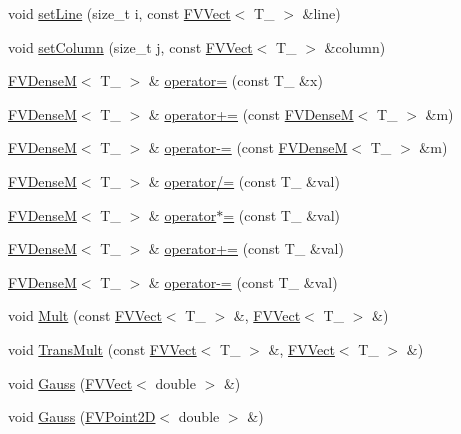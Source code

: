 \begin{DoxyCompactItemize}
\item 
void \hyperlink{classFVDenseM_a9441579962fe169d09d5fd504388da1a}{setLine} (size\_\-t i, const \hyperlink{classFVVect}{FVVect}$<$ T\_\- $>$ \&line)
\item 
void \hyperlink{classFVDenseM_a888ffa88e606f11b989361ef3b1176b6}{setColumn} (size\_\-t j, const \hyperlink{classFVVect}{FVVect}$<$ T\_\- $>$ \&column)
\item 
\hyperlink{classFVDenseM}{FVDenseM}$<$ T\_\- $>$ \& \hyperlink{classFVDenseM_a06daa883e8e99590868bfd95689d638b}{operator=} (const T\_\- \&x)
\item 
\hyperlink{classFVDenseM}{FVDenseM}$<$ T\_\- $>$ \& \hyperlink{classFVDenseM_a1beab84f76baeed61a89633796b6cc29}{operator+=} (const \hyperlink{classFVDenseM}{FVDenseM}$<$ T\_\- $>$ \&m)
\item 
\hyperlink{classFVDenseM}{FVDenseM}$<$ T\_\- $>$ \& \hyperlink{classFVDenseM_afb8664e2aaa7a8897ee8aef014a494da}{operator-\/=} (const \hyperlink{classFVDenseM}{FVDenseM}$<$ T\_\- $>$ \&m)
\item 
\hyperlink{classFVDenseM}{FVDenseM}$<$ T\_\- $>$ \& \hyperlink{classFVDenseM_aa5ac6333bf08dddc27d45d6f7ddb79c9}{operator/=} (const T\_\- \&val)
\item 
\hyperlink{classFVDenseM}{FVDenseM}$<$ T\_\- $>$ \& \hyperlink{classFVDenseM_ac8084800d4aa148e541d0b00412180df}{operator$\ast$=} (const T\_\- \&val)
\item 
\hyperlink{classFVDenseM}{FVDenseM}$<$ T\_\- $>$ \& \hyperlink{classFVDenseM_aaf2cfed3edf8bd21a0830ddf20c61462}{operator+=} (const T\_\- \&val)
\item 
\hyperlink{classFVDenseM}{FVDenseM}$<$ T\_\- $>$ \& \hyperlink{classFVDenseM_ad8aa01530a594eb81c92744755f07a4e}{operator-\/=} (const T\_\- \&val)
\item 
void \hyperlink{classFVDenseM_a75a2ced8980671cf0a67b6fdd5ededb5}{Mult} (const \hyperlink{classFVVect}{FVVect}$<$ T\_\- $>$ \&, \hyperlink{classFVVect}{FVVect}$<$ T\_\- $>$ \&)
\item 
void \hyperlink{classFVDenseM_a51effb20cd7b29168e5f8eb0a96067a0}{TransMult} (const \hyperlink{classFVVect}{FVVect}$<$ T\_\- $>$ \&, \hyperlink{classFVVect}{FVVect}$<$ T\_\- $>$ \&)
\item 
void \hyperlink{classFVDenseM_aea5f8e6172b2bc847ebe020b047508f6}{Gauss} (\hyperlink{classFVVect}{FVVect}$<$ double $>$ \&)
\item 
void \hyperlink{classFVDenseM_a24fe34cc0ea853e2b1db3a67af13a7d8}{Gauss} (\hyperlink{classFVPoint2D}{FVPoint2D}$<$ double $>$ \&)

\end{DoxyCompactItemize}
